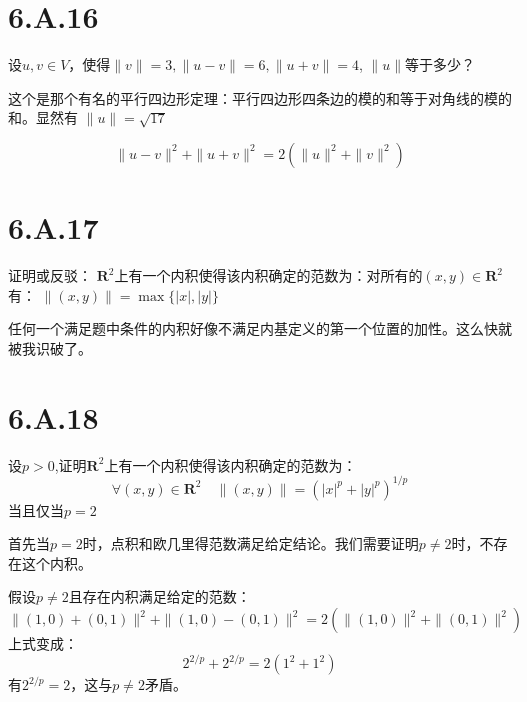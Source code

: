 \documentclass[10pt,a4paper,UTF8]{article}
\begin{document}
\section{6.A.16}
\label{sec:orge6d3ec5}


\begin{tikzproblem}
设\(u,v\in V\)，使得\(\| v \|=3, \| u-v \| = 6, \| u+v \| = 4\), \(\| u \|\)等于多少？
\end{tikzproblem}

\begin{tikzanswer}
这个是那个有名的平行四边形定理：平行四边形四条边的模的和等于对角线的模的和。显然有 \(\| u \| = \sqrt{17}\)

\begin{equation}
\label{eq:19}
 \| u-v \|^{2} + \| u+v \|^{2} = 2( \| u \|^{2} + \| v \|^{2} )
\end{equation}
\end{tikzanswer}
\section{6.A.17}
\label{sec:org6fd80fc}


\begin{tikzproblem}
证明或反驳： \(\mathbf{R}^{2}\)上有一个内积使得该内积确定的范数为：对所有的\((x,y)\in \mathbf{R}^{2}\)有： \(\| (x,y) \| = \max\{|x|,|y|\}\)
\end{tikzproblem}

\begin{tikzanswer}
任何一个满足题中条件的内积好像不满足内基定义的第一个位置的加性。这么快就被我识破了。
\end{tikzanswer}
\section{6.A.18}
\label{sec:org2f0761b}


\begin{tikzproblem}
设\(p > 0\),证明\(\mathbf{R}^{2}\)上有一个内积使得该内积确定的范数为：
\begin{equation}
\label{eq:20}
\forall (x,y)\in \mathbf{R}^{2}\quad \| (x,y) \| = ( |x|^{p} + |y|^{p} )^{1/p}
\end{equation}
当且仅当\(p=2\)
\end{tikzproblem}

\begin{tikzanswer}
首先当\(p=2\)时，点积和欧几里得范数满足给定结论。我们需要证明\(p\neq 2\)时，不存在这个内积。

假设\(p\neq 2\)且存在内积满足给定的范数：
\begin{equation}
\label{eq:21}
\| (1,0) + (0,1) \|^{2} + \| (1,0) - (0,1) \|^{2} = 2 ( \| (1,0) \|^{2} + \| (0,1) \|^{2} )
\end{equation}
上式变成：
\begin{equation}
\label{eq:22}
2^{2/p} + 2^{2/p} = 2 (1^{2} + 1^{2})
\end{equation}
有\(2^{2/p} = 2\)，这与\(p\neq 2\)矛盾。
\end{tikzanswer}
\end{document}
